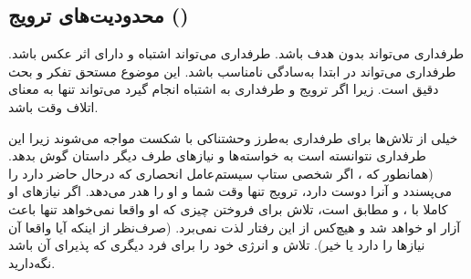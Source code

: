\subsection{محدودیت‌های ترویج ()}

طرفداری می‌تواند بدون هدف باشد. طرفداری می‌تواند اشتباه و دارای اثر عکس باشد.
طرفداری می‌تواند در ابتدا به‌سادگی نامناسب باشد. این موضوع مستحق تفکر و بحث دقیق است.
زیرا اگر ترویج و طرفداری به اشتباه انجام گیرد می‌تواند تنها به معنای اتلاف وقت باشد.

خیلی از تلاش‌ها برای طرفداری به‌طرز وحشتناکی با شکست مواجه می‌شوند
زیرا این طرفداری نتوانسته است به خواسته‌ها و نیاز‌های طرف دیگر داستان
گوش بدهد. (همانطور که 
،
اگر شخصی ستاپ سیستم‌عامل انحصاری که درحال حاضر دارد را می‌پسندد
و آنرا دوست دارد، ترویج تنها وقت شما و او را هدر می‌دهد.
اگر نیازهای او کاملا با ،  و
مطابق است، تلاش برای فروختن چیزی که او واقعا نمی‌خواهد 
تنها باعث آزار او خواهد شد و هیچ‌کس از این رفتار لذت نمی‌برد.
(صرف‌نظر از اینکه آیا واقعا آن نیازها را دارد یا خیر).
تلاش و انرژی خود را برای فرد دیگری که پذیرای آن باشد نگه‌‌دارید.

